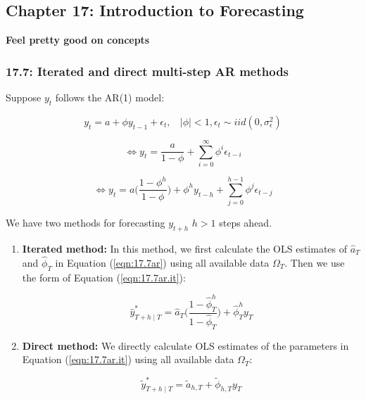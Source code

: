 %
%
%
%
%
%

\subsection{Chapter 17: Introduction to Forecasting}

\textbf{Feel pretty good on concepts}

\subsubsection{17.7: Iterated and direct multi-step AR methods}

Suppose \(y_t\) follows the AR(1) model: 

\begin{equation} \label{eqn:17.7ar}
y_t = a + \phi y_{t-1} + \epsilon_t, \ \ \ \ |\phi| < 1, \epsilon_t \sim iid(0, \sigma_\epsilon^2)
\end{equation}

\[
\iff y_t =  \frac{a}{1 - \phi} + \sum_{i=0}^\infty \phi^i \epsilon_{t-i}
\]

\begin{equation} \label{eqn:17.7ar.it}
\iff y_t = a \bigg( \frac{1 - \phi^h}{1 - \phi} \bigg) + \phi^h y_{t-h} + \sum_{j=0}^{h-1} \phi^j \epsilon_{t-j}
\end{equation}

We have two methods for forecasting \(y_{t+h}\) \(h >1\) steps ahead.

\begin{enumerate}[(1)]

\item \textbf{Iterated method:} In this method, we first calculate the OLS estimates of \(\hat{a}_T\) and \(\hat{\phi}_T\) in Equation (\ref{eqn:17.7ar}) using all available data \(\Omega_T\). Then we use the form of Equation (\ref{eqn:17.7ar.it}):

\[
\hat{y}_{T+h \mid T}^* = \hat{a}_T \bigg( \frac{1 - \hat{\phi}_T^h}{1 - \hat{\phi}_T} \bigg) + \hat{\phi}_T^h y_{T} 
\] 

\item \textbf{Direct method:} We directly calculate OLS estimates of the parameters in Equation (\ref{eqn:17.7ar.it}) using all available data \(\Omega_T\):

\[
\tilde{y}_{T+h \mid T}^* = \tilde{a}_{h,T} + \tilde{\phi}_{h,T} y_{T} 
\] 

\end{enumerate}

